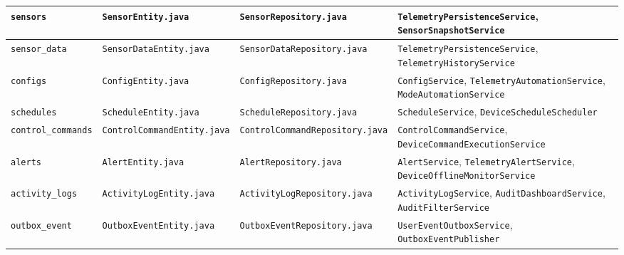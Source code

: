 {\begin{longtable}{|p{}|p{}|p{}|p{}|}
\hline
\texttt{sensors} & \texttt{SensorEntity.java} & \texttt{SensorRepository.java} & \texttt{TelemetryPersistenceService}, \texttt{SensorSnapshotService} \\
\hline
\texttt{sensor\_data} & \texttt{SensorDataEntity.java} & \texttt{SensorDataRepository.java} & \texttt{TelemetryPersistenceService}, \texttt{TelemetryHistoryService} \\
\hline
\texttt{configs} & \texttt{ConfigEntity.java} & \texttt{ConfigRepository.java} & \texttt{ConfigService}, \texttt{TelemetryAutomationService}, \texttt{ModeAutomationService} \\
\hline
\texttt{schedules} & \texttt{ScheduleEntity.java} & \texttt{ScheduleRepository.java} & \texttt{ScheduleService}, \texttt{DeviceScheduleScheduler} \\
\hline
\texttt{control\_commands} & \texttt{ControlCommandEntity.java} & \texttt{ControlCommandRepository.java} & \texttt{ControlCommandService}, \texttt{DeviceCommandExecutionService} \\
\hline
\texttt{alerts} & \texttt{AlertEntity.java} & \texttt{AlertRepository.java} & \texttt{AlertService}, \texttt{TelemetryAlertService}, \texttt{DeviceOfflineMonitorService} \\
\hline
\texttt{activity\_logs} & \texttt{ActivityLogEntity.java} & \texttt{ActivityLogRepository.java} & \texttt{ActivityLogService}, \texttt{AuditDashboardService}, \texttt{AuditFilterService} \\
\hline
\texttt{outbox\_event} & \texttt{OutboxEventEntity.java} & \texttt{OutboxEventRepository.java} & \texttt{UserEventOutboxService}, \texttt{OutboxEventPublisher} \\
\hline
\end{longtable}
}
